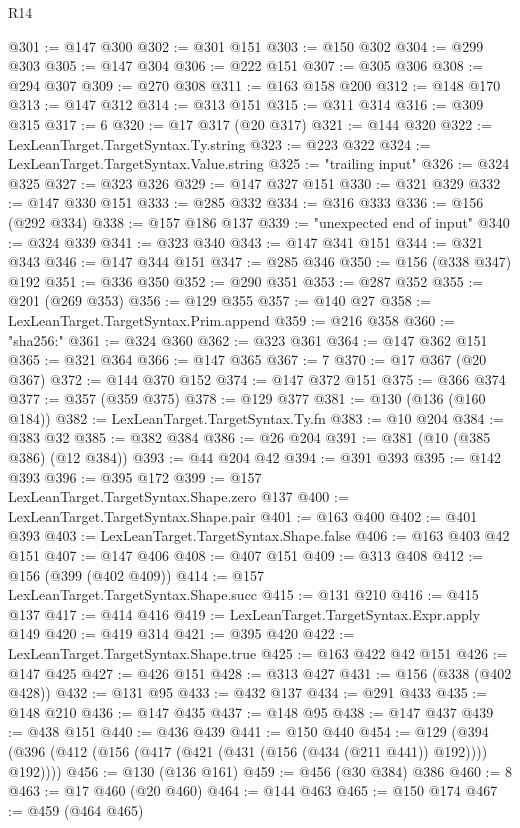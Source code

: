 \begin{lexlean}{R14}
\begin{coremodule}
@301 := @147 @300
@302 := @301 @151
@303 := @150 @302
@304 := @299 @303
@305 := @147 @304
@306 := @222 @151
@307 := @305 @306
@308 := @294 @307
@309 := @270 @308
@311 := @163 @158 @200
@312 := @148 @170
@313 := @147 @312
@314 := @313 @151
@315 := @311 @314
@316 := @309 @315
@317 := 6
@320 := @17 @317 (@20 @317)
@321 := @144 @320
@322 := LexLeanTarget.TargetSyntax.Ty.string
@323 := @223 @322
@324 := LexLeanTarget.TargetSyntax.Value.string
@325 := "trailing input"
@326 := @324 @325
@327 := @323 @326
@329 := @147 @327 @151
@330 := @321 @329
@332 := @147 @330 @151
@333 := @285 @332
@334 := @316 @333
@336 := @156 (@292 @334)
@338 := @157 @186 @137
@339 := "unexpected end of input"
@340 := @324 @339
@341 := @323 @340
@343 := @147 @341 @151
@344 := @321 @343
@346 := @147 @344 @151
@347 := @285 @346
@350 := @156 (@338 @347) @192
@351 := @336 @350
@352 := @290 @351
@353 := @287 @352
@355 := @201 (@269 @353)
@356 := @129 @355
@357 := @140 @27
@358 := LexLeanTarget.TargetSyntax.Prim.append
@359 := @216 @358
@360 := "sha256:"
@361 := @324 @360
@362 := @323 @361
@364 := @147 @362 @151
@365 := @321 @364
@366 := @147 @365
@367 := 7
@370 := @17 @367 (@20 @367)
@372 := @144 @370 @152
@374 := @147 @372 @151
@375 := @366 @374
@377 := @357 (@359 @375)
@378 := @129 @377
@381 := @130 (@136 (@160 @184))
@382 := LexLeanTarget.TargetSyntax.Ty.fn
@383 := @10 @204
@384 := @383 @32
@385 := @382 @384
@386 := @26 @204
@391 := @381 (@10 (@385 @386) (@12 @384))
@393 := @44 @204 @42
@394 := @391 @393
@395 := @142 @393
@396 := @395 @172
@399 := @157 LexLeanTarget.TargetSyntax.Shape.zero @137
@400 := LexLeanTarget.TargetSyntax.Shape.pair
@401 := @163 @400
@402 := @401 @393
@403 := LexLeanTarget.TargetSyntax.Shape.false
@406 := @163 @403 @42 @151
@407 := @147 @406
@408 := @407 @151
@409 := @313 @408
@412 := @156 (@399 (@402 @409))
@414 := @157 LexLeanTarget.TargetSyntax.Shape.succ
@415 := @131 @210
@416 := @415 @137
@417 := @414 @416
@419 := LexLeanTarget.TargetSyntax.Expr.apply @149
@420 := @419 @314
@421 := @395 @420
@422 := LexLeanTarget.TargetSyntax.Shape.true
@425 := @163 @422 @42 @151
@426 := @147 @425
@427 := @426 @151
@428 := @313 @427
@431 := @156 (@338 (@402 @428))
@432 := @131 @95
@433 := @432 @137
@434 := @291 @433
@435 := @148 @210
@436 := @147 @435
@437 := @148 @95
@438 := @147 @437
@439 := @438 @151
@440 := @436 @439
@441 := @150 @440
@454 := @129 (@394 (@396 (@412 (@156 (@417 (@421 (@431 (@156 (@434 (@211 @441)) @192)))) @192))))
@456 := @130 (@136 @161)
@459 := @456 (@30 @384) @386
@460 := 8
@463 := @17 @460 (@20 @460)
@464 := @144 @463
@465 := @150 @174
@467 := @459 (@464 @465)

\end{coremodule}
\end{lexlean}
